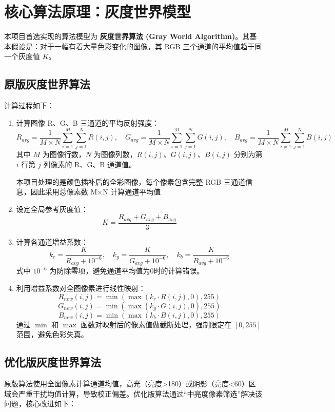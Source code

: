 \documentclass[12pt,a4paper,UTF8]{ctexart} %
\begin{document}
\section{核心算法原理：灰度世界模型}

本项目首选实现的算法模型为 \textbf{灰度世界算法 (Gray World Algorithm)}。其基本假设是：对于一幅有着大量色彩变化的图像，其 RGB 三个通道的平均值趋于同一个灰度值 $K$。

\subsection{原版灰度世界算法}
计算过程如下：
\begin{enumerate}
    \item 计算图像 R、G、B 三通道的平均反射强度：
    \[
    R_{avg} = \frac{1}{M \times N} \sum_{i=1}^{M} \sum_{j=1}^{N} R(i,j), \quad 
    G_{avg} = \frac{1}{M \times N} \sum_{i=1}^{M} \sum_{j=1}^{N} G(i,j), \quad 
    B_{avg} = \frac{1}{M \times N} \sum_{i=1}^{M} \sum_{j=1}^{N} B(i,j)
    \]
    其中 $M$ 为图像行数，$N$ 为图像列数，$R(i,j)$、$G(i,j)$、$B(i,j)$ 分别为第 $i$ 行第 $j$ 列像素的 R、G、B 通道值。
    
    本项目处理的是颜色插补后的全彩图像，每个像素包含完整 RGB 三通道信息，因此采用总像素数 M×N 计算通道平均值
    
    \item 设定全局参考灰度值：
    \[
    K = \frac{R_{avg} + G_{avg} + B_{avg}}{3}
    \]
    
    \item 计算各通道增益系数：
    \[
    k_r = \frac{K}{R_{avg} + 10^{-6}}, \quad 
    k_g = \frac{K}{G_{avg} + 10^{-6}}, \quad 
    k_b = \frac{K}{B_{avg} + 10^{-6}}
    \]
    式中 $10^{-6}$ 为防除零项，避免通道平均值为0时的计算错误。
    
    \item 利用增益系数对全图像素进行线性映射：
    \[
    R_{new}(i,j) = \min\left( \max\left( k_r \cdot R(i,j), 0 \right), 255 \right)
    \]
    \[
    G_{new}(i,j) = \min\left( \max\left( k_g \cdot G(i,j), 0 \right), 255 \right)
    \]
    \[
    B_{new}(i,j) = \min\left( \max\left( k_b \cdot B(i,j), 0 \right), 255 \right)
    \]
    通过 $\min$ 和 $\max$ 函数对映射后的像素值做截断处理，强制限定在 $[0,255]$ 范围，避免色彩失真。
\end{enumerate}

\subsection{优化版灰度世界算法}
原版算法使用全图像素计算通道均值，高光（亮度>180）或阴影（亮度<60）区域会严重干扰均值计算，导致校正偏差。优化版算法通过“中亮度像素筛选”解决该问题，核心改进如下：
\end{document}
